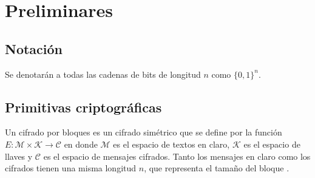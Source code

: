 %
%

\section{Preliminares}


\subsection{Notación}


Se denotarán a todas las cadenas de bits de longitud $ n $ como $ \{ 0, 1 \}^n $.

\subsection{Primitivas criptográficas}

Un cifrado por bloques es un cifrado simétrico que se define por la función $ E:
\mathcal{M} \times \mathcal{K} \rightarrow \mathcal{C} $ en donde $ \mathcal{M} $
es el espacio de textos en claro, $ \mathcal{K} $ es el espacio de llaves y $
\mathcal{C} $ es el espacio de mensajes cifrados. Tanto los mensajes en claro
como los cifrados tienen una misma longitud $ n $, que representa el tamaño del
bloque \cite{menezes}.




